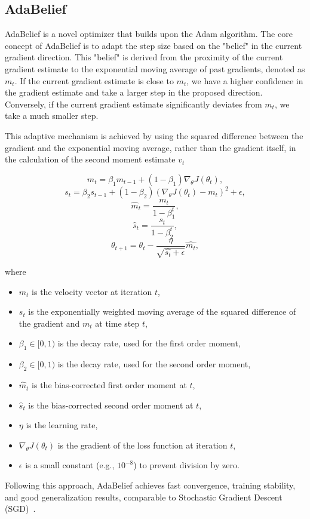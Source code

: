 \subsection{AdaBelief \cite{zhuang2020adabeliefoptimizeradaptingstepsizes}}
\label{sec:adabelief}


AdaBelief \cite{zhuang2020adabeliefoptimizeradaptingstepsizes} is a novel optimizer that builds
upon the Adam algorithm. The core concept of AdaBelief is to adapt the step size based on the
"belief" in the current gradient direction. This "belief" is derived from the proximity of the
current gradient estimate to the exponential moving average of past gradients, denoted as $m_t$.
If the current gradient estimate is close to $m_t$, we have a higher confidence in the gradient
estimate and take a larger step in the proposed direction. Conversely, if the current gradient
estimate significantly deviates from $m_t$, we take a much smaller step.

This adaptive mechanism is achieved by using the squared difference between the gradient
and the exponential moving average, rather than the gradient itself, in the calculation of the
second moment estimate $v_t$ \cite{zhuang2020adabelief}



\[m_t = \beta_1 m_{t-1} + (1 - \beta_1) \nabla_{\theta} J(\theta_t),\]
\[s_t = \beta_2 s_{t-1} + (1 - \beta_2) (\nabla_{\theta} J(\theta_t) - m_t)^2 + \epsilon,\]
\[\hat{m}_t = \frac{m_t}{1-\beta_1^t},\]
\[\hat{s}_t = \frac{s_t}{1-\beta_2^t},\]
\[\theta_{t+1} = \theta_t - \frac{\eta}{\sqrt{\hat{s_t} + \epsilon}} \hat{m_t},\]

where
\begin{itemize}
    \item $m_t$ is the velocity vector at iteration $t$,
    \item $s_t$ is the exponentially weighted moving average of the squared difference of the gradient and $m_t$ at time step $t$,
    \item $\beta_1 \in [0, 1) $ is the decay rate, used for the first order moment,
    \item $\beta_2 \in [0, 1) $ is the decay rate,  used for the second order moment,
    \item $\hat{m}_t$ is the bias-corrected first order moment at $t$,
    \item $\hat{s}_t$ is the bias-corrected second order moment at $t$,
    \item $\eta$ is the learning rate,
    \item $\nabla_{\theta} J(\theta_t)$ is the gradient of the loss function at iteration $t$,
    \item $\epsilon$ is a small constant (e.g., $10^{-8}$) to prevent division by zero.
\end{itemize}
Following this approach, AdaBelief achieves fast convergence, training stability, and good generalization results, comparable to Stochastic Gradient Descent (SGD)~\cite{zhuang2020adabelief}.


